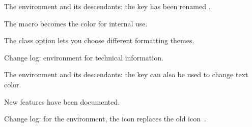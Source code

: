 \documentclass[10pt, a4paper]{tutodoc}
\begin{document}
\small

\begin{tdocbreak}
    \item The  environment and its descendants: the  key has been renamed .

    \item The macro  becomes the color  for internal use.
\end{tdocbreak}


\begin{tdocnew}
    \item The  class option lets you choose different formatting themes.

	\item Change log:  environment for technical information.
	
    \item The  environment and its descendants: the  key can also be used to change text color.

    \item New features have been documented.
\end{tdocnew}


\begin{tdocupdate}
    \item Change log: for the  environment, the icon  replaces the old icon \fbox{\faMagic}\,.
\end{tdocupdate}
\end{document}

